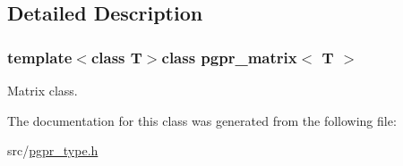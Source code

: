 \subsection{Detailed Description}
\subsubsection*{template$<$class T$>$class pgpr\+\_\+matrix$<$ T $>$}

Matrix class. 

The documentation for this class was generated from the following file\+:\begin{DoxyCompactItemize}
\item 
src/\hyperlink{pgpr__type_8h}{pgpr\+\_\+type.\+h}\end{DoxyCompactItemize}

